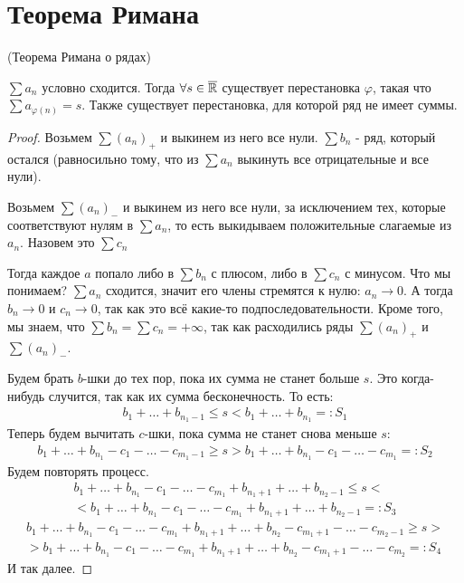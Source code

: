 \section{Теорема Римана}
\begin{theorem}
    (Теорема Римана о рядах)

    $\sum a_n$ условно сходится. Тогда $\forall s \in \overline {\mathbb{R}}$ существует перестановка $\varphi$,
     такая что $\sum a_{\varphi(n)} = s$. Также существует перестановка, для которой ряд не имеет суммы.
\end{theorem}
\begin{proof}
    Возьмем $\sum(a_n)_+$ и выкинем из него все нули. $\sum b_n$ - ряд, который остался (равносильно тому, что из $\sum a_n$ выкинуть все отрицательные и все нули).

    Возьмем $\sum(a_n)_-$ и выкинем из него все нули, за исключением тех, которые соответствуют нулям в $\sum a_n$, то есть выкидываем положительные слагаемые из $a_n$. Назовем это $\sum c_n$

    Тогда каждое $a$ попало либо в $\sum b_n$ с плюсом, либо в $\sum c_n$ с минусом.
    Что мы понимаем? $\sum a_n$ сходится, значит его члены стремятся к нулю: $a_n \to 0$. А тогда $b_n \to 0$ и $ c_n \to 0$, так как это всё какие-то подпоследовательности. 
    Кроме того, мы знаем, что $\sum b_n = \sum c_n = +\infty$, так как расходились ряды $\sum(a_n)_+$ и $\sum(a_n)_-$.

    Будем брать $b$-шки до тех пор, пока их сумма не станет больше $s$. Это когда-нибудь случится, так как их сумма бесконечность. То есть:
    \begin{gather*}
        b_1 + \ldots + b_{n_1 - 1} \leqslant s < b_1 + \ldots + b_{n_1} =: S_1
    \end{gather*}
    Теперь будем вычитать $c$-шки, пока сумма не станет снова меньше $s$:
    \begin{gather*}
        b_1 + \ldots + b_{n_1} - c_1 - \ldots - c_{m_1 - 1} \geqslant s > b_1 + \ldots + b_{n_1} - c_1 - \ldots - c_{m_1} =: S_2
    \end{gather*}
    Будем повторять процесс.
    \begin{gather*}
        b_1 + \ldots + b_{n_1} - c_1 - \ldots -  c_{m_1} + b_{n_1 + 1} + \ldots + b_{n_2-1} \leqslant s < \\
        < b_1 + \ldots + b_{n_1} - c_1 - \ldots -  c_{m_1} + b_{n_1 + 1} + \ldots + b_{n_2-1} =: S_3
    \end{gather*}
    \begin{gather*}
        b_1 + \ldots + b_{n_1} - c_1 - \ldots -  c_{m_1} + b_{n_1 + 1} + \ldots + b_{n_2} - c_{m_1+1} - \ldots - c_{m_2-1} \geqslant s > \\
         > b_1 + \ldots + b_{n_1} - c_1 - \ldots -  c_{m_1} + b_{n_1 + 1} + \ldots + b_{n_2} - c_{m_1+1} - \ldots - c_{m_2} =: S_4
    \end{gather*}
    И так далее.


\end{proof}
